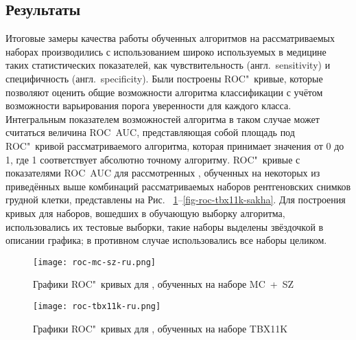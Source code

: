 \subsection{Результаты}

Итоговые замеры качества работы обученных алгоритмов на рассматриваемых наборах производились с использованием широко используемых в медицине таких статистических показателей, как чувствительность (англ.~sensitivity) и специфичность (англ.~specificity). Были построены ROC"~кривые, которые позволяют оценить общие возможности алгоритма классификации с учётом возможности варьирования порога уверенности для каждого класса. Интегральным показателем возможностей алгоритма в таком случае может считаться величина ROC~AUC, представляющая собой площадь под ROC"~кривой рассматриваемого алгоритма, которая принимает значения от 0 до 1, где 1 соответствует абсолютно точному алгоритму. ROC"~кривые с показателями ROC~AUC для рассмотренных , обученных на некоторых из приведённых выше комбинаций рассматриваемых наборов рентгеновских снимков грудной клетки, представлены на Рис.~
\ref{fig-roc-mc-sz}--\ref{fig-roc-tbx11k-sakha}.
Для построения кривых для наборов, вошедших в обучающую выборку алгоритма, использовались их тестовые выборки, такие наборы выделены звёздочкой в описании графика; в противном случае использовались все наборы целиком.

\begin{figure}[ht]%
	\centering
	\texttt{[image: roc-mc-sz-ru.png]}
	\caption{Графики ROC"~кривых для , обученных на наборе MC~+~SZ}\label{fig-roc-mc-sz}
\end{figure}
%
%
\begin{figure}[ht]%
	\centering
	\texttt{[image: roc-tbx11k-ru.png]}
	\caption{Графики ROC"~кривых для , обученных на наборе TBX11K}\label{fig-roc-tbx11k}
\end{figure}



